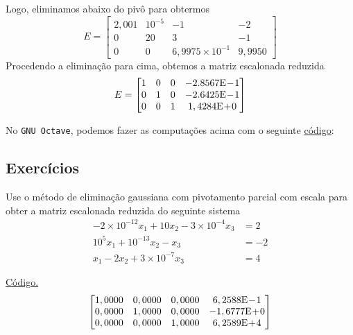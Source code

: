 \begin{ex}
\begin{equation}
  \end{equation}
  Logo, eliminamos abaixo do pivô para obtermos
  \begin{equation}
    E =
    \begin{bmatrix}
      2,001 & 10^{-5} & -1 & -2\\
      0 & 20 & 3 & -1\\
      0 & 0 & 6,9975\times 10^{-1} & 9,9950
    \end{bmatrix}
  \end{equation}
  Procedendo a eliminação para cima, obtemos a matriz escalonada reduzida
  \begin{equation}
    E =
    \begin{bmatrix}
      1 & 0 & 0 & -2.8567\mathrm{E}\!-\!1\\
      0 & 1 & 0 & -2.6425\mathrm{E}\!-\!1\\
      0 & 0 & 1 & 1,4284\mathrm{E}\!+\!0
    \end{bmatrix}
  \end{equation}

\ifisoctave
No \verb+GNU Octave+, podemos fazer as computações acima com o seguinte \href{https://github.com/phkonzen/notas/blob/master/src/MatematicaNumerica/cap_sl_direto/dados/ex_egauss_pivo/ex_egauss_pivo.m}{código}:

\fi
\end{ex}

\subsection*{Exercícios}

\begin{exer}\label{exer:egauss_pivo_exec}
  Use o método de eliminação gaussiana com pivotamento parcial com escala para obter a matriz escalonada reduzida do seguinte sistema
  \begin{align}
    -2\times 10^{-12}x_1 + 10x_2 - 3\times 10^{-4}x_3 &= 2\\
    10^5x_1 + 10^{-13}x_2 - x_3 &= -2\\
    x_1 - 2x_2 + 3\times 10^{-7}x_3 &= 4
  \end{align}
\end{exer}
\begin{resp}
  \ifisoctave 
  \href{https://github.com/phkonzen/notas/blob/master/src/MatematicaNumerica/cap_sl_direto/dados/exer_egauss_pivo_exec/exer_egauss_pivo_exec.m}{Código.} 
  \fi
  $$
  \begin{bmatrix}
   1,0000 &  0,0000 &  0,0000 & 6,2588\mathrm{E}\!-\!1\\
   0,0000 &  1,0000 &  0,0000 & -1,6777\mathrm{E}\!+\!0\\
   0,0000 &  0,0000 &  1,0000 & 6,2589\mathrm{E}\!+\!4
  \end{bmatrix}
  $$
\end{resp}

